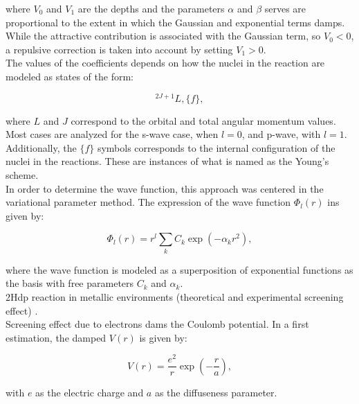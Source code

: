 \documentclass[openany]{book}
\begin{document}
where $V_0$ and $V_1$ are the depths and the parameters $\alpha$ and $\beta$ serves are proportional to the extent in which the Gaussian and exponential terms damps. While the attractive contribution is associated with the Gaussian term, so $V_0 < 0$, a repulsive correction is taken into account by setting  $V_1 > 0$. \\

The values of the coefficients depends on how the nuclei in the reaction are modeled as states of the form: 

\begin{equation}\label{eq:potential_Young_scheme}
	{}^{2J + 1} L, \{f\},
\end{equation}

where $L$ and $J$ correspond to the orbital and total angular momentum values. Most cases are analyzed for the s-wave case, when $l = 0$, and p-wave, with $l = 1$. Additionally, the $\{f\}$ symbols corresponds to the internal configuration of the nuclei in the reactions. These are instances of what is named as the Young's scheme.\\

In order to determine the wave function, this approach was centered in the variational parameter method. The expression of the wave function $\Phi_l(r)$ ins given by:

\begin{equation}\label{eq:potential_variational}
	\Phi_l(r) = r^l \sum_{k} C_k \exp(-\alpha_k r^2),
\end{equation}

where the wave function is modeled as a superposition of exponential functions as the basis with free parameters $C_k$ and $\alpha_k$. \\

2Hdp reaction in metallic environments (theoretical and experimental screening effect)  \cite{czerski_huke_heide_ruprecht_2006}. \\

Screening effect due to electrons dams the Coulomb potential. In a first estimation, the damped $V(r)$ is given by:

\begin{equation}\label{eq:potential_screening_simple}
	V(r) = \frac{e^2}{r} \exp {\left( - \frac{r}{a}\right)},
\end{equation}

with $e$ as the electric charge and $a$ as the diffuseness parameter. \\
\end{document}
